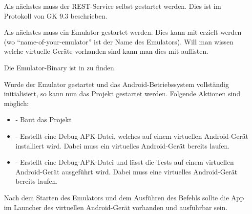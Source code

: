 Als nächstes muss der REST-Service selbst gestartet werden. Dies ist im Protokoll von GK 9.3 beschrieben.


Als nächstes muss ein Emulator gestartet werden. Dies kann mit  erzielt werden (wo ``name-of-your-emulator'' ist der Name des Emulators). Will man wissen welche virtuelle Geräte vorhanden sind kann man dies mit  auflisten. \cite{stackoverflow-launch}

Die Emulator-Binary ist in  zu finden.

Wurde der Emulator gestartet und das Android-Betriebssystem vollständig initialisiert, so kann nun das Projekt gestartet werden. Folgende Aktionen sind möglich:
\begin{itemize}
	\item {} - Baut das Projekt
	\item {} - Erstellt eine Debug-APK-Datei, welches auf einem virtuellen Android-Gerät installiert wird. Dabei muss ein virtuelles Android-Gerät bereits laufen.
	\item {} - Erstellt eine Debug-APK-Datei und lässt die Tests auf einem virtuellen Android-Gerät ausgeführt wird. Dabei muss eine virtuelles Android-Gerät bereits laufen.
\end{itemize}

Nach dem Starten des Emulators und dem Ausführen des Befehls  sollte die App im Launcher des virtuellen Android-Gerät vorhanden und ausführbar sein.



